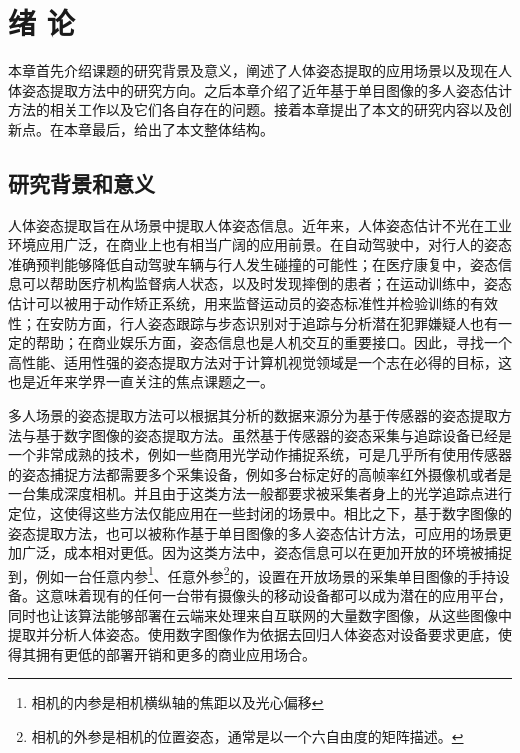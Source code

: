 \chapter{绪 论}
\label{cha:intro}

本章首先介绍课题的研究背景及意义，阐述了人体姿态提取的应用场景以及现在人体姿态提取方法中的研究方向。之后本章介绍了近年基于单目图像的多人姿态估计方法的相关工作以及它们各自存在的问题。接着本章提出了本文的研究内容以及创新点。在本章最后，给出了本文整体结构。

\section{研究背景和意义}
\label{sec:generalbackground}
人体姿态提取旨在从场景中提取人体姿态信息。近年来，人体姿态估计不光在工业环境应用广泛，在商业上也有相当广阔的应用前景。在自动驾驶中，对行人的姿态准确预判能够降低自动驾驶车辆与行人发生碰撞的可能性；在医疗康复中，姿态信息可以帮助医疗机构监督病人状态，以及时发现摔倒的患者；在运动训练中，姿态估计可以被用于动作矫正系统，用来监督运动员的姿态标准性并检验训练的有效性；在安防方面，行人姿态跟踪与步态识别对于追踪与分析潜在犯罪嫌疑人也有一定的帮助；在商业娱乐方面，姿态信息也是人机交互的重要接口。因此，寻找一个高性能、适用性强的姿态提取方法对于计算机视觉领域是一个志在必得的目标，这也是近年来学界一直关注的焦点课题之一。

多人场景的姿态提取方法可以根据其分析的数据来源分为基于传感器的姿态提取方法与基于数字图像的姿态提取方法。虽然基于传感器的姿态采集与追踪设备已经是一个非常成熟的技术，例如一些商用光学动作捕捉系统，可是几乎所有使用传感器的姿态捕捉方法都需要多个采集设备，例如多台标定好的高帧率红外摄像机或者是一台集成深度相机。并且由于这类方法一般都要求被采集者身上的光学追踪点进行定位，这使得这些方法仅能应用在一些封闭的场景中。相比之下，基于数字图像的姿态提取方法，也可以被称作基于单目图像的多人姿态估计方法，可应用的场景更加广泛，成本相对更低。因为这类方法中，姿态信息可以在更加开放的环境被捕捉到，例如一台任意内参\footnote{相机的内参是相机横纵轴的焦距以及光心偏移}、任意外参\footnote{相机的外参是相机的位置姿态，通常是以一个六自由度的矩阵描述。}的，设置在开放场景的采集单目图像的手持设备。这意味着现有的任何一台带有摄像头的移动设备都可以成为潜在的应用平台，同时也让该算法能够部署在云端来处理来自互联网的大量数字图像，从这些图像中提取并分析人体姿态。使用数字图像作为依据去回归人体姿态对设备要求更底，使得其拥有更低的部署开销和更多的商业应用场合。

